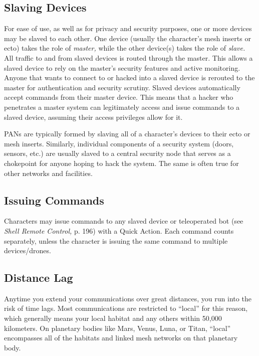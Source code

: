 \subsection{Slaving Devices}


For ease of use, as well as for privacy and security 
purposes, one or more devices may be slaved to each 
other. One device (usually the character's mesh inserts 
or ecto) takes the role of \textit{master,} while the other 
device(s) takes the role of \textit{slave.} All traffic to and 
from slaved devices is routed through the master. This 
allows a slaved device to rely on the master's security 
features and active monitoring. Anyone that wants to 
connect to or hacked into a slaved device is rerouted 
to the master for authentication and security scrutiny.
Slaved devices automatically accept commands from 
their master device. This means that a hacker who 
penetrates a master system can legitimately access 
and issue commands to a slaved device, assuming their 
access privileges allow for it.

PANs are typically formed by slaving all of a character's
devices to their ecto or mesh inserts. Similarly,
individual components of a security system (doors, 
sensors, etc.) are usually slaved to a central security 
node that serves as a chokepoint for anyone hoping 
to hack the system. The same is often true for other 
networks and facilities.

\subsection{Issuing Commands}

Characters may issue commands to any slaved device 
or teleoperated bot (see \textit{Shell Remote Control,} p. 196) 
with a Quick Action. Each command counts separately, 
unless the character is issuing the same command to 
multiple devices/drones.

\subsection{Distance Lag}

Anytime you extend your communications over great 
distances, you run into the risk of time lags. Most 
communications are restricted to ``local'' for this 
reason, which generally means your local habitat 
and any others within 50,000 kilometers. On planetary
bodies like Mars, Venus, Luna, or Titan, ``local''
encompasses all of the habitats and linked mesh networks
on that planetary body.

